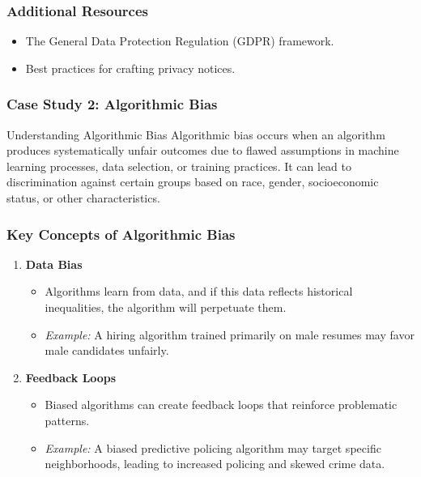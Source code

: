 \documentclass{beamer}
\begin{document}
\begin{frame}[fragile]
    \frametitle{Additional Resources}
    \begin{itemize}
        \item The General Data Protection Regulation (GDPR) framework.
        \item Best practices for crafting privacy notices.
    \end{itemize}
\end{frame}

\begin{frame}[fragile]
    \frametitle{Case Study 2: Algorithmic Bias}

    \begin{block}{Understanding Algorithmic Bias}
        Algorithmic bias occurs when an algorithm produces systematically unfair outcomes due to flawed assumptions in machine learning processes, data selection, or training practices. 
        It can lead to discrimination against certain groups based on race, gender, socioeconomic status, or other characteristics.
    \end{block}
\end{frame}

\begin{frame}[fragile]
    \frametitle{Key Concepts of Algorithmic Bias}

    \begin{enumerate}
        \item \textbf{Data Bias}
        \begin{itemize}
            \item Algorithms learn from data, and if this data reflects historical inequalities, the algorithm will perpetuate them.
            \item \textit{Example:} A hiring algorithm trained primarily on male resumes may favor male candidates unfairly.
        \end{itemize}

        \item \textbf{Feedback Loops}
        \begin{itemize}
            \item Biased algorithms can create feedback loops that reinforce problematic patterns.
            \item \textit{Example:} A biased predictive policing algorithm may target specific neighborhoods, leading to increased policing and skewed crime data.
        \end{itemize}
    \end{enumerate}
\end{frame}
\end{document}
